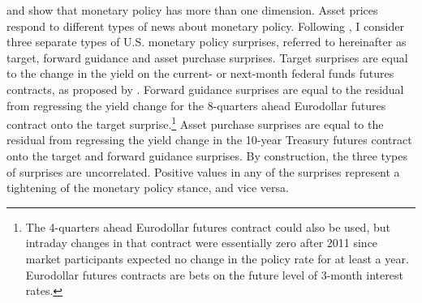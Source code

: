 {\cite{GSS:2005a} and \cite{Swanson:2018} show that monetary policy has more than one dimension. Asset prices respond to different types of news about monetary policy.
Following \cite{RogersScottiWright:2018}, I consider three separate types of U.S. monetary policy surprises,
referred to hereinafter as target, forward guidance and asset purchase surprises.
Target surprises are equal to the change in the yield on the current- or next-month federal funds futures contracts, as proposed by \cite{Kuttner:2001}.
Forward guidance surprises are equal to the residual from regressing the yield change for the 8-quarters ahead Eurodollar futures contract onto the target surprise.\footnote{ The 4-quarters ahead Eurodollar futures contract could also be used, but intraday changes in that contract were essentially zero after 2011 since market participants expected no change in the policy rate for at least a year. Eurodollar futures contracts are bets on the future level of 3-month interest rates.} %
Asset purchase surprises are equal to the residual from regressing the yield change in the 10-year Treasury futures contract onto the target and forward guidance surprises.
By construction, the three types of surprises are uncorrelated.
Positive values in any of the surprises represent a tightening of the monetary policy stance, and vice versa.

}
